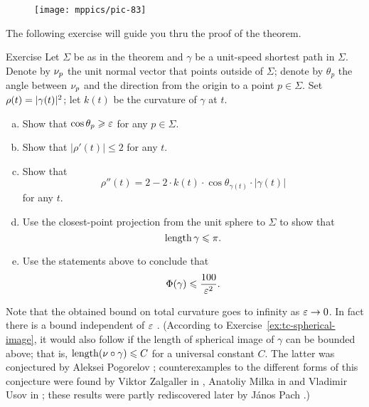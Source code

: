 \begin{wrapfigure}{r}{48 mm}
\vskip-4mm
\centering
\texttt{[image: mppics/pic-83]}
\vskip-0mm
\end{wrapfigure}

The following exercise will guide you thru the proof of the theorem. 

\begin{thm}{Exercise}\label{ex:bound-tc}
Let $\Sigma$ be as in the theorem and $\gamma$ be a unit-speed shortest path in $\Sigma$.
Denote by $\nu_p$ the unit normal vector that points outside of $\Sigma$;
denote by $\theta_p$ the angle between $\nu_p$ and the direction from the origin to a point $p\in\Sigma$.
Set $\rho(t)\z=|\gamma(t)|^2$; let $k(t)$ be the curvature of $\gamma$ at $t$.
\begin{enumerate}[(a)]
\item Show that $\cos\theta_p\geqslant \varepsilon$ for any $p\in \Sigma$.
\item Show that $|\rho'(t)|\le 2$ for any $t$.
\item Show that 
\[\rho''(t)=2-2\cdot k(t)\cdot \cos \theta_{\gamma(t)}\cdot |\gamma(t)|\]
for any $t$.
\item Use the closest-point projection from the unit sphere to $\Sigma$ to show that 
\[\mathop{\rm length}\nolimits \gamma\leqslant \pi.\]
\item Use the statements above to conclude that 
\[\Phi({\gamma})\leqslant \frac{100}{\varepsilon^2}.\]
\end{enumerate}
\end{thm}

Note that the obtained bound on total curvature goes to infinity as $\varepsilon\to 0$.
In fact there is a bound independent of $\varepsilon$ \cite{lebedeva-petrunin}.
(According to Exercise~\ref{ex:tc-spherical-image}, it would also follow if the length of spherical image of $\gamma$ can be bounded above; 
that is, $\mathop{\rm length}\nolimits(\nu\circ\gamma)\leqslant C$ for a universal constant $C$.
The latter was conjectured by Aleksei Pogorelov \cite{pogorelov};
counterexamples to the different forms of this conjecture were found 
by Viktor Zalgaller in \cite{zalgaller},
Anatoliy Milka in \cite{milka}
and Vladimir Usov in \cite{usov};
these results were partly rediscovered later 
by J\'{a}nos Pach \cite{pach}.)
